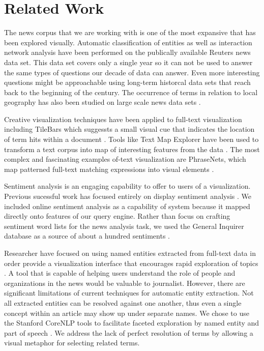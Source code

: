 \section{Related Work}
The news corpus that we are working with is one of the most expansive that has been explored visually.  Automatic classification of entities \cite{wermter2002selforganizing} as well as interaction network analysis \cite{johnson2004network} have been performed on the publically available Reuters news data set.  This data set covers only a single year so it can not be used to answer the same types of questions our decade of data can answer.  Even more interesting questions might be approachable using long-term historcal data sets that reach back to the beginning of the century.  The occurrence of terms in relation to local geography has also been studied on large scale news data sets \cite{mehler2006spatial}.

Creative visualization techniques have been applied to full-text visualization including TileBars which suggessts a small visual cue that indicates the location of term hits within a document \cite{hearst1995tilebars}.  Tools like Text Map Explorer have been used to transform a text corpus into map of interesting features from the data \cite{paulovich2006text}.  The most complex and fascinating examples of-text visualization are PhraseNets, which map patterned full-text matching expressions into visual elements \cite{phrasenets}.

Sentiment analysis is an engaging capability to offer to users of a visualization.  Previous sucessful work has focused entirely on display sentiment analysis \cite{wanner2009visual}.  We included online sentiment analysis as a capability of system because it mapped directly onto features of our query engine.  Rather than focus on crafting sentiment word lists for the news analysis task, we used the General Inquirer database as a source of about a hundred sentiments \cite{generalinquirer}.

Researcher have focused on using named entities extracted from full-text data in order provide a visualization interface that encourages rapid exploration of topics \cite{grobelnik2004visualization}.  A tool that is capable of helping users understand the role of people and organizations in the news would be valuable to journalist.  However, there are significant limitations of current techniques for automatic entity extraction.  Not all extracted entities can be resolved against one another, thus even a single concept within an article may show up under separate names.  We chose to use the Stanford CoreNLP tools to facilitate faceted exploration by named entity and part of speech \cite{finkel2005incorporating,toutanova2003feature}.  We address the lack of perfect resolution of terms by allowing a visual metaphor for selecting related terms.

